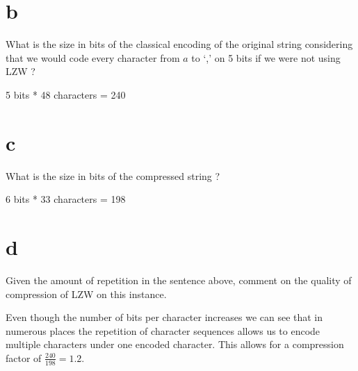 \documentclass[12pt]{article}
\begin{document}
\begin{enumerate}
\part{b} What is the size in bits of the classical encoding of the original string considering that we would code every character from $a$ to `,' on 5 bits if we were not using LZW  ?

5 bits * 48 characters = 240

\part{c} What is the size in bits of the compressed string ?

6 bits * 33 characters = 198

\part{d} Given the amount of repetition in the sentence above, comment on the quality of compression of LZW on this instance.

Even though the number of bits per character increases we can see that in numerous places the repetition of character sequences allows us to encode multiple characters under one encoded character. This allows for a compression factor of $\frac{240}{198} = 1.2$.

\end{enumerate}
\end{document}

